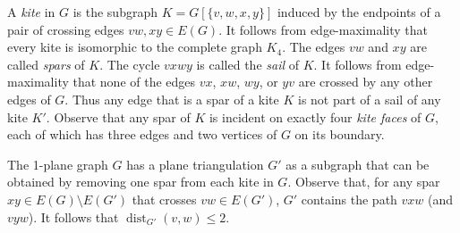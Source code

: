 \documentclass{patmorin}
\DeclareMathOperator{\dist}{dist}
\renewcommand{\le}{\leqslant}
\begin{document}
A \emph{kite} in $G$ is the subgraph $K=G[\{v,w,x,y\}]$ induced by the endpoints of a pair of crossing edges $vw,xy\in E(G)$.  It follows from edge-maximality that every kite is isomorphic to the complete graph $K_4$.
The edges $vw$ and $xy$ are called \emph{spars} of $K$.  The cycle $vxwy$ is called the \emph{sail} of $K$.  It follows from edge-maximality that none of the edges $vx$, $xw$, $wy$, or $yv$ are crossed by any other edges of $G$. Thus any edge that is a spar of a kite $K$ is not part of a sail of any kite $K'$. Observe that any spar of $K$ is incident on exactly four \emph{kite faces} of $G$, each of which has three edges and two vertices of $G$ on its boundary.

The 1-plane graph $G$ has a plane triangulation $G'$ as a subgraph that can be obtained by removing one spar from each kite in $G$.  Observe that, for any spar $xy\in E(G)\setminus E(G')$ that crosses $vw\in E(G')$, $G'$ contains the path $vxw$ (and $vyw$).  It follows that $\dist_{G'}(v,w)\le 2$. 
\end{document}

